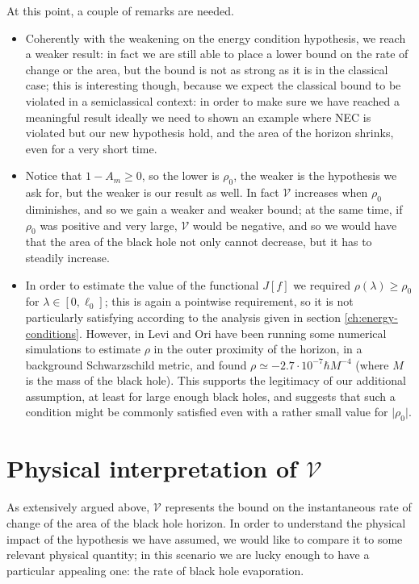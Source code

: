 \begin{remark}
	At this point, a couple of remarks are needed. 

	\begin{itemize}
		\item[\ding{99}] Coherently with the weakening on the energy condition hypothesis, we reach a weaker result: in fact we are still able to place a lower bound on the rate of change or the area, but the bound is not as strong as it is in the classical case; this is interesting though, because we expect the classical bound to be violated in a semiclassical context: in order to make sure we have reached a meaningful result ideally we need to shown an example where NEC is violated but our new hypothesis hold, and the area of the horizon shrinks, even for a very short time.
  		\item[\ding{99}] Notice that \(1-A_m \ge 0\), so the lower is \(\rho_0\), the weaker is the hypothesis we ask for, but the weaker is our result as well. In fact \(\mathcal{V}\) increases when \(\rho_0\) diminishes, and so we gain a weaker and weaker bound; at the same time, if \(\rho_0\) was positive and very large, \(\mathcal{V}\) would be negative, and so we would have that the area of the black hole not only cannot decrease, but it has to steadily increase.
    	\item[\ding{99}] In order to estimate the value of the functional \(J[f]\) we required \(\rho (\lambda)\ge\rho_0\) for \(\lambda\in [0, \ell_0]\); this is again a pointwise requirement, so it is not particularly satisfying according to the analysis given in section \ref{ch:energy-conditions}. However, in \cite{levi2016versatile} Levi and Ori have been running some numerical simulations to estimate \(\rho\) in the outer proximity of the horizon, in a background Schwarzschild metric, and found \(\rho \simeq -2.7\cdot 10^{-7} \hbar M^{-4}\) (where \(M\) is the mass of the black hole). This supports the legitimacy of our additional assumption, at least for large enough black holes, and suggests that such a condition might be commonly satisfied even with a rather small value for \(\vert\rho_0\vert\).
	\end{itemize}
	
\end{remark}

\section[physical-interpretation-V]{Physical interpretation of \(\mathcal{V}\)}
As extensively argued above, \(\mathcal{V}\) represents the bound on the instantaneous rate of change of the area of the black hole horizon. In order to understand the physical impact of the hypothesis we have assumed, we would like to compare it to some relevant physical quantity; in this scenario we are lucky enough to have a particular appealing one: the rate of black hole evaporation.

